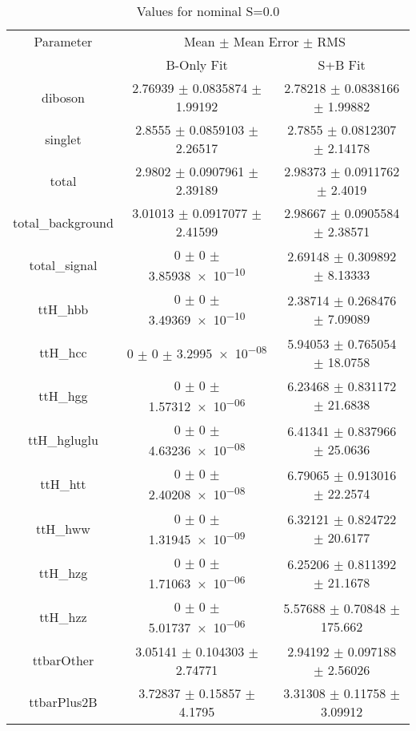 \begin{table}
\centering
\caption{Values for nominal S=0.0}
\begin{tabular}{ccc}
\toprule
Parameter & \multicolumn{2}{c}{Mean $\pm$ Mean Error $\pm$ RMS}\\
 & B-Only Fit & S+B Fit\\
\midrule
diboson & \num{2.76939} $\pm$ \num{0.0835874} $\pm$ \num{1.99192} & \num{2.78218} $\pm$ \num{0.0838166} $\pm$ \num{1.99882}\\
singlet & \num{2.8555} $\pm$ \num{0.0859103} $\pm$ \num{2.26517} & \num{2.7855} $\pm$ \num{0.0812307} $\pm$ \num{2.14178}\\
total & \num{2.9802} $\pm$ \num{0.0907961} $\pm$ \num{2.39189} & \num{2.98373} $\pm$ \num{0.0911762} $\pm$ \num{2.4019}\\
total\_background & \num{3.01013} $\pm$ \num{0.0917077} $\pm$ \num{2.41599} & \num{2.98667} $\pm$ \num{0.0905584} $\pm$ \num{2.38571}\\
total\_signal & \num{0} $\pm$ \num{0} $\pm$ \num{3.85938e-10} & \num{2.69148} $\pm$ \num{0.309892} $\pm$ \num{8.13333}\\
ttH\_hbb & \num{0} $\pm$ \num{0} $\pm$ \num{3.49369e-10} & \num{2.38714} $\pm$ \num{0.268476} $\pm$ \num{7.09089}\\
ttH\_hcc & \num{0} $\pm$ \num{0} $\pm$ \num{3.2995e-08} & \num{5.94053} $\pm$ \num{0.765054} $\pm$ \num{18.0758}\\
ttH\_hgg & \num{0} $\pm$ \num{0} $\pm$ \num{1.57312e-06} & \num{6.23468} $\pm$ \num{0.831172} $\pm$ \num{21.6838}\\
ttH\_hgluglu & \num{0} $\pm$ \num{0} $\pm$ \num{4.63236e-08} & \num{6.41341} $\pm$ \num{0.837966} $\pm$ \num{25.0636}\\
ttH\_htt & \num{0} $\pm$ \num{0} $\pm$ \num{2.40208e-08} & \num{6.79065} $\pm$ \num{0.913016} $\pm$ \num{22.2574}\\
ttH\_hww & \num{0} $\pm$ \num{0} $\pm$ \num{1.31945e-09} & \num{6.32121} $\pm$ \num{0.824722} $\pm$ \num{20.6177}\\
ttH\_hzg & \num{0} $\pm$ \num{0} $\pm$ \num{1.71063e-06} & \num{6.25206} $\pm$ \num{0.811392} $\pm$ \num{21.1678}\\
ttH\_hzz & \num{0} $\pm$ \num{0} $\pm$ \num{5.01737e-06} & \num{5.57688} $\pm$ \num{0.70848} $\pm$ \num{175.662}\\
ttbarOther & \num{3.05141} $\pm$ \num{0.104303} $\pm$ \num{2.74771} & \num{2.94192} $\pm$ \num{0.097188} $\pm$ \num{2.56026}\\
ttbarPlus2B & \num{3.72837} $\pm$ \num{0.15857} $\pm$ \num{4.1795} & \num{3.31308} $\pm$ \num{0.11758} $\pm$ \num{3.09912}\\

\end{tabular}
\end{table}
